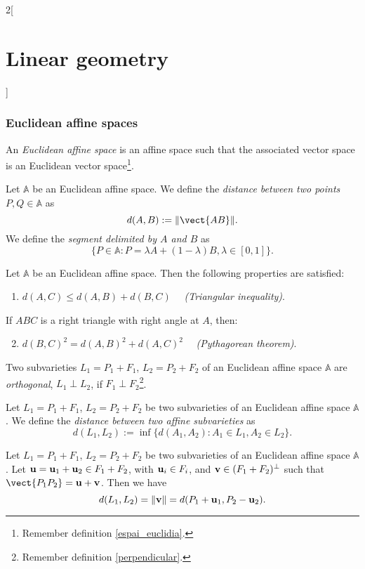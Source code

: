 \documentclass[../../../main.tex]{subfiles}
\begin{document}
\begin{multicols}{2}[\section{Linear geometry}]
    \subsubsection*{Euclidean affine spaces}
    \begin{definition}
        An \textit{Euclidean affine space} is an affine space such that the associated vector space is an Euclidean vector space\footnote{Remember definition \ref{espai_euclidia}.}.
    \end{definition}
    \begin{definition}
        Let $\mathbb{A}$ be an Euclidean affine space. We define the \textit{distance between two points $P,Q\in\mathbb{A}$} as $$d(A,B):=\|\vect{AB}\|.$$ We define the \textit{segment delimited by $A$ and $B$} as $$\{P\in\mathbb{A}:P=\lambda A+(1-\lambda)B,\lambda\in[0,1]\}.$$
    \end{definition}
    \begin{prop}
        Let $\mathbb{A}$ be an Euclidean affine space. Then the following properties are satisfied:
        \begin{enumerate}
            \item $d(A,C)\leq d(A,B)+d(B,C)\quad$ \textit{(Triangular inequality)}.
        \end{enumerate}
        If $ABC$ is a right triangle with right angle at $A$, then:
        \begin{enumerate}
            \setcounter{enumi}{1}
            \item $d(B,C)^2=d(A,B)^2+d(A,C)^2\quad$ \textit{(Pythagorean theorem)}.
        \end{enumerate}
    \end{prop}
    \begin{definition}
        Two subvarieties $L_1=P_1+F_1$, $L_2=P_2+F_2$ of an Euclidean affine space $\mathbb{A}$ are \textit{orthogonal}, $L_1\perp L_2$, if $F_1\perp F_2$\footnote{Remember definition \ref{perpendicular}.}.
    \end{definition}
    \begin{definition}
        Let $L_1=P_1+F_1$, $L_2=P_2+F_2$ be two subvarieties of an Euclidean affine space $\mathbb{A}$. We define the \textit{distance between two affine subvarieties} as $$d(L_1,L_2):=\inf\{d(A_1,A_2):A_1\in L_1, A_2\in L_2\}.$$
    \end{definition}
    \begin{theorem}
        Let $L_1=P_1+F_1$, $L_2=P_2+F_2$ be two subvarieties of an Euclidean affine space $\mathbb{A}$. Let $\vb{u}=\vb{u}_1+\vb{u}_2\in F_1+F_2$, with $\vb{u}_i\in F_i$, and $\vb{v}\in(F_1+F_2)^\perp$ such that $\vect{P_1P_2}=\mathblack{u}+\mathblack{v}$. Then we have $$d(L_1,L_2)=\|\vb{v}\|=d(P_1+\vb{u}_1,P_2-\vb{u}_2).$$
    \end{theorem}

\end{multicols}
\end{document}
